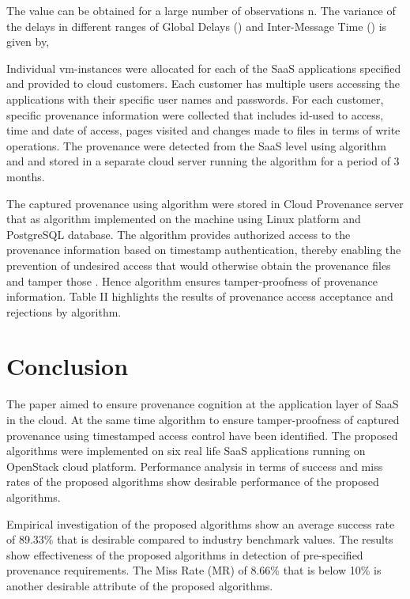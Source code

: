 \documentclass[conference]{IEEEtran}
\begin{document}
The value can be obtained for a large number of observations n. The variance of the delays in different ranges of Global Delays () and Inter-Message Time () is given by,



Individual vm-instances were allocated for each of the SaaS applications specified and provided to cloud customers. Each customer has multiple users accessing the applications with their specific user names and passwords. For each customer, specific provenance information were collected that includes id-used to access, time and date of access, pages visited and changes made to files in terms of write operations. The provenance were detected from the SaaS level using  algorithm and and stored in a separate cloud server running the  algorithm for a period of 3 months.



The captured provenance using  algorithm were stored in Cloud Provenance server that as  algorithm implemented on the machine using Linux platform and PostgreSQL database. The  algorithm provides authorized access to the provenance information based on timestamp authentication, thereby enabling the prevention of undesired access that would otherwise obtain the provenance files and tamper those \cite{imran2014active}. Hence  algorithm ensures tamper-proofness of provenance information. Table II highlights the results of provenance access acceptance and rejections by  algorithm.

\section{Conclusion}

The paper aimed to ensure provenance cognition at the application layer of SaaS in the cloud. At the same time algorithm to ensure tamper-proofness of captured provenance using timestamped access control have been identified. The proposed algorithms were implemented on six real life SaaS applications running on OpenStack cloud platform. Performance analysis in terms of success and miss rates of the proposed algorithms show desirable performance of the proposed algorithms.

Empirical investigation of the proposed algorithms show an average success rate of 89.33\% that is desirable compared to industry benchmark values. The results show effectiveness of the proposed algorithms in detection of pre-specified provenance requirements. The Miss Rate (MR) of 8.66\% that is below 10\% is another desirable attribute of the proposed algorithms.
\end{document}
